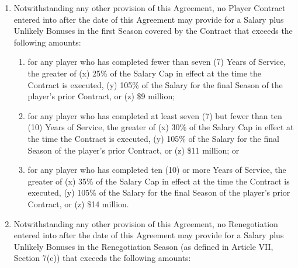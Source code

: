 \documentclass[
]{book}
\providecommand{\tightlist}{%
  \setlength{\itemsep}{0pt}\setlength{\parskip}{0pt}}
\begin{document}
\begin{enumerate}
\def\labelenumi{(\alph{enumi})}
\tightlist
\item
  Notwithstanding any other provision of this Agreement, no Player Contract entered into after the date of this Agreement may provide for a Salary plus Unlikely Bonuses in the first Season covered by the Contract that exceeds the following amounts:

  \begin{enumerate}
  \def\labelenumii{(\roman{enumii})}
  \tightlist
  \item
    for any player who has completed fewer than seven (7) Years of Service, the greater of (x) 25\% of the Salary Cap in effect at the time the Contract is executed, (y) 105\% of the Salary for the final Season of the player's prior Contract, or (z) \$9 million;
  \item
    for any player who has completed at least seven (7) but fewer than ten (10) Years of Service, the greater of (x) 30\% of the Salary Cap in effect at the time the Contract is executed, (y) 105\% of the Salary for the final Season of the player's prior Contract, or (z) \$11 million; or
  \item
    for any player who has completed ten (10) or more Years of Service, the greater of (x) 35\% of the Salary Cap in effect at the time the Contract is executed, (y) 105\% of the Salary for the final Season of the player's prior Contract, or (z) \$14 million.
  \end{enumerate}
\item
  Notwithstanding any other provision of this Agreement, no Renegotiation entered into after the date of this Agreement may provide for a Salary plus Unlikely Bonuses in the Renegotiation Season (as defined in Article VII, Section 7(c)) that exceeds the following amounts:


\end{enumerate}
\end{document}

